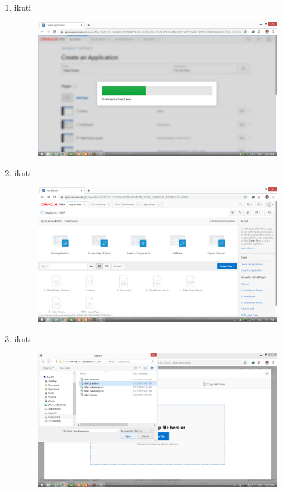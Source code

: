 \documentclass[11pt]{article}
\begin{document}
\begin{enumerate}
\item ikuti
\begin{figure}
        \centerline{\includegraphics[scale=0.1]{img/11proses.png}}
        \caption{}
		\label{langkah12}
\end{figure}

\item ikuti
\begin{figure}
        \centerline{\includegraphics[scale=0.1]{img/12appbuilderlagi.png}}
        \caption{}
		\label{langkah13}
\end{figure}

\item ikuti
\begin{figure}
        \centerline{\includegraphics[scale=0.1]{img/13dragtabel.png}}
        \caption{}
		\label{langkah14}
\end{figure}


\end{enumerate}
\end{document}
